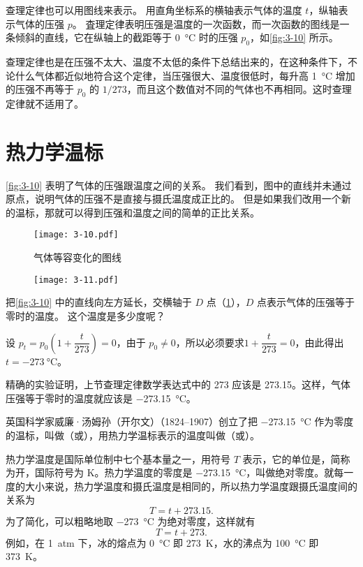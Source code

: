 查理定律也可以用图线来表示。
用直角坐标系的横轴表示气体的温度 $t$，纵轴表示气体的压强 $p$。
査理定律表明压强是温度的一次函数，而一次函数的图线是一条倾斜的直线，它在纵轴上的截距等于 \qty{0}{\celsius} 时的压强 $p_0$，如\cref{fig:3-10} 所示。

查理定律也是在压强不太大、温度不太低的条件下总结出来的，在这种条件下，不论什么气体都近似地符合这个定律，当压强很大、温度很低时，每升高 \qty{1}{\celsius} 增加的压强不再等于 $p_0$ 的 $1/273$，而且这个数值对不同的气体也不再相同。这时查理定律就不适用了。

\section{热力学温标}\label{sec:thermodynamic_temperature}
\cref{fig:3-10} 表明了气体的压强跟温度之间的关系。
我们看到，图中的直线并未通过原点，说明气体的压强不是直接与摄氏温度成正比的。
但是如果我们改用一个新的温标，那就可以得到压强和温度之间的简单的正比关系。

\begin{figure}
	\begin{minipage}{0.4\linewidth}\centering
		\texttt{[image: 3-10.pdf]}
		\caption{气体等容变化的图线}\label{fig:3-10}
	\end{minipage}\hfill
	\begin{minipage}{0.58\linewidth}\centering
		\texttt{[image: 3-11.pdf]}
		\caption{}\label{fig:3-11}
	\end{minipage}
\end{figure}

把\cref{fig:3-10} 中的直线向左方延长，交横轴于 $D$ 点（\cref{fig:3-11}），$D$ 点表示气体的压强等于零时的温度。
这个温度是多少度呢？

设 $p_t=p_0 \left(1+\dfrac{t}{273}\right)=0$，由于 $p_0\ne 0$，所以必须要求$1+\dfrac{t}{273}=0$，由此得出 $t=\qty{-273}{\celsius}$。

精确的实验证明，上节查理定律数学表达式中的 273 应该是 273.15。这样，气体压强等于零时的温度就应该是 \qty{-273.15}{\celsius}。

英国科学家威廉·汤姆孙（开尔文）（1824--1907）创立了把 \qty{-273.15}{\celsius} 作为零度的温标，叫做（或），用热力学温标表示的温度叫做（或）。

热力学温度是国际单位制中七个基本量之一，用符号 $T$ 表示，它的单位是，简称为开，国际符号为 \unit{K}。热力学温度的零度是 \qty{-273.15}{\celsius}，叫做绝对零度。就每一度的大小来说，热力学温度和摄氏温度是相同的，所以热力学温度跟摄氏温度间的关系为
\[T=t+273.15.\]
为了简化，可以粗略地取  \qty{-273}{\celsius} 为绝对零度，这样就有
\[T=t+273.\]
例如，在 \qty{1}{atm} 下，冰的熔点为 \qty{0}{\celsius} 即 \qty{273}{K}，水的沸点为 \qty{100}{\celsius} 即 \qty{373}{K}。

